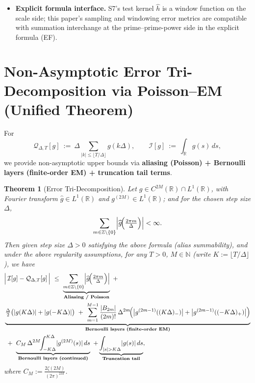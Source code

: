 \documentclass[11pt,a4paper]{article}
\newtheorem{theorem}{Theorem}[section]
\theoremstyle{remark}
\begin{document}
\begin{itemize}
\item \textbf{Explicit formula interface.} S7's test kernel $\widehat{h}$ is a window function on the scale side; this paper's sampling and windowing error metrics are compatible with summation interchange at the prime--prime-power side in the explicit formula (EF).
\end{itemize}

\section{Non-Asymptotic Error Tri-Decomposition via Poisson--EM (Unified Theorem)}

For
\begin{equation}
\mathcal{Q}_{\Delta,T}[g]\ :=\ \Delta\!\sum_{|k|\le \lfloor T/\Delta\rfloor}\! g(k\Delta),\qquad
\mathcal{I}[g]\ :=\ \int_{\mathbb{R}} g(s)\,ds,
\end{equation}
we provide non-asymptotic upper bounds via \textbf{aliasing (Poisson) + Bernoulli layers (finite-order EM) + truncation tail terms}.

\begin{theorem}[Error Tri-Decomposition]\label{thm:tri_decomp}
Let $g\in C^{2M}(\mathbb{R})\cap L^1(\mathbb{R})$, with Fourier transform $\widehat{g}\in L^1(\mathbb{R})$ and $g^{(2M)}\in L^1(\mathbb{R})$; and for the chosen step size $\Delta$,
\begin{equation}
\sum_{m\in\mathbb{Z}\setminus\{0\}}\Bigl|\widehat{g}\!\Bigl(\tfrac{2\pi m}{\Delta}\Bigr)\Bigr|<\infty.
\end{equation}
Then given step size $\Delta>0$ satisfying the above formula (alias summability), and under the above regularity assumptions, for any $T>0$, $M\in\mathbb{N}$ (write $K:=\lfloor T/\Delta\rfloor$), we have
\begin{align}
&\Bigl|\,\mathcal{I}[g]-\mathcal{Q}_{\Delta,T}[g]\,\Bigr|
\ \le\
\underbrace{\sum_{m\in\mathbb{Z}\setminus\{0\}}\Bigl|\widehat{g}\!\Bigl(\tfrac{2\pi m}{\Delta}\Bigr)\Bigr|}_{\textbf{Aliasing / Poisson}}
\ + \notag \\
&\underbrace{\tfrac{\Delta}{2}\bigl(|g(K\Delta)|+|g(-K\Delta)|\bigr)
\ +\ \sum_{m=1}^{M-1}\frac{|B_{2m}|}{(2m)!}\,\Delta^{2m}\!\Bigl(\bigl|g^{(2m-1)}((K\Delta)_{-})\bigr|+\bigl|g^{(2m-1)}((-K\Delta)_{+})\bigr|\Bigr)}_{\textbf{Bernoulli layers (finite-order EM)}} \notag \\
&\ +\ \underbrace{C_M\,\Delta^{2M}\!\!\int_{-K\Delta}^{K\Delta}\! |g^{(2M)}(s)|\,ds}_{\textbf{Bernoulli layers (continued)}}
\ +
\underbrace{\int_{|s|>K\Delta}\! |g(s)|\,ds}_{\textbf{Truncation tail}},
\end{align}
where $C_M:=\frac{2\zeta(2M)}{(2\pi)^{2M}}$.
\end{theorem}
\end{document}
